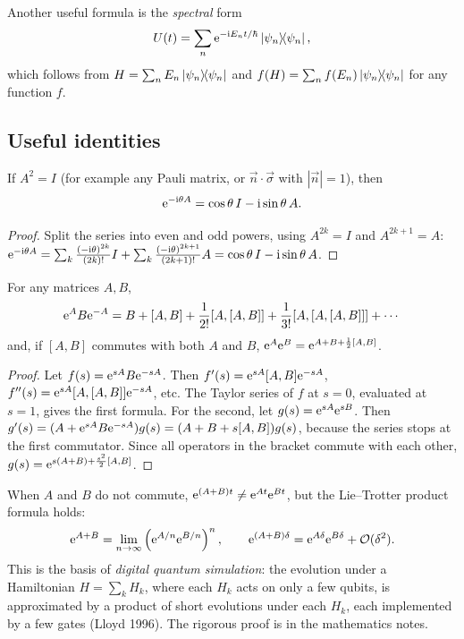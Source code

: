 Another useful formula is the \emph{spectral} form
\begin{equation}\label{eq:spectralU}
  U(t)=\sum_n\mathrm e^{-\mathrm i E_nt/\hbar}\left|\psi_n\middle\rangle\!\middle\langle\psi_n\right|,
\end{equation}
which follows from $H=\sum_nE_n\left|\psi_n\middle\rangle\!\middle\langle\psi_n\right|$ and $f(H)=\sum_n f(E_n)\left|\psi_n\middle\rangle\!\middle\langle\psi_n\right|$ for any function $f$.

\subsection{Useful identities}
\begin{proposition}\label{prop:involution}
If $A^2=I$ (for example any Pauli matrix, or $\vec n\cdot\vec\sigma$ with $|\vec n|=1$), then
\begin{equation}
  \mathrm e^{-\mathrm i\theta A}=\cos\theta\,I-\mathrm i\sin\theta\,A.
\end{equation}
\end{proposition}
\begin{proof}
Split the series into even and odd powers, using $A^{2k}=I$ and $A^{2k+1}=A$:
$\mathrm e^{-\mathrm i\theta A}=\sum_k\frac{(-\mathrm i\theta)^{2k}}{(2k)!}I+\sum_k\frac{(-\mathrm i\theta)^{2k+1}}{(2k+1)!}A
=\cos\theta\,I-\mathrm i\sin\theta\,A$.
\end{proof}

\begin{proposition}\label{prop:bch}
For any matrices $A,B$,
\begin{equation}
  \mathrm e^{A}B\mathrm e^{-A}=B+[A,B]+\frac1{2!}[A,[A,B]]+\frac1{3!}[A,[A,[A,B]]]+\cdots
\end{equation}
and, if $[A,B]$ commutes with both $A$ and $B$, $\mathrm e^{A}\mathrm e^{B}=\mathrm e^{A+B+\frac12[A,B]}$.
\end{proposition}
\begin{proof}
Let $f(s)=\mathrm e^{sA}B\mathrm e^{-sA}$. Then $f'(s)=\mathrm e^{sA}[A,B]\mathrm e^{-sA}$, $f''(s)=\mathrm e^{sA}[A,[A,B]]\mathrm e^{-sA}$, etc. The Taylor series of $f$ at $s=0$,
evaluated at $s=1$, gives the first formula. For the second, let $g(s)=\mathrm e^{sA}\mathrm e^{sB}$. Then
$g'(s)=(A+\mathrm e^{sA}B\mathrm e^{-sA})g(s)=(A+B+s[A,B])g(s)$, because the series stops at the first commutator. Since all operators in the
bracket commute with each other, $g(s)=\mathrm e^{s(A+B)+\frac{s^2}2[A,B]}$.
\end{proof}

When $A$ and $B$ do not commute, $\mathrm e^{(A+B)t}\neq\mathrm e^{At}\mathrm e^{Bt}$, but the Lie--Trotter product formula holds:
\begin{equation}\label{eq:trotter}
  \mathrm e^{A+B}=\lim_{n\to\infty}\left(\mathrm e^{A/n}\mathrm e^{B/n}\right)^n,\qquad
  \mathrm e^{(A+B)\delta}=\mathrm e^{A\delta}\mathrm e^{B\delta}+\mathcal O(\delta^2).
\end{equation}
This is the basis of \emph{digital quantum simulation}: the evolution under a Hamiltonian $H=\sum_k H_k$, where each $H_k$ acts on only a
few qubits, is approximated by a product of short evolutions under each $H_k$, each implemented by a few gates (Lloyd 1996). The rigorous
proof is in the mathematics notes.

